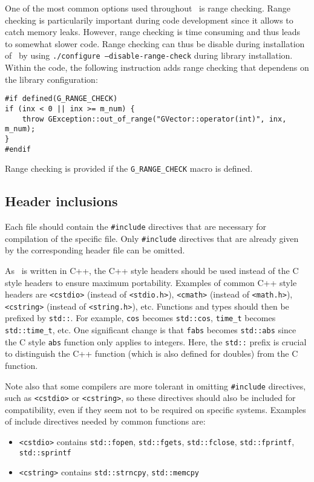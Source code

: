 \documentclass{article}[12pt,a4]
\begin{document}
One of the most common options used throughout \this\ is range checking.
Range checking is particularily important during code development since it allows to catch
memory leaks.
However, range checking is time consuming and thus leads to somewhat slower code.
Range checking can thus be disable during installation of \this\ by using
{\tt ./configure --disable-range-check} during library installation.
Within the code, the following instruction adds range checking that dependens on
the library configuration:

\begin{verbatim}
#if defined(G_RANGE_CHECK)
if (inx < 0 || inx >= m_num) {
    throw GException::out_of_range("GVector::operator(int)", inx, m_num);
}
#endif
\end{verbatim}

Range checking is provided if the {\tt G\_RANGE\_CHECK} macro is defined.


\subsection{Header inclusions}

Each file should contain the {\tt \#include} directives that are necessary for compilation of
the specific file.
Only {\tt \#include} directives that are already given by the corresponding header file can
be omitted.

As \this\ is written in C++, the C++ style headers should be used instead of the C style
headers to ensure maximum portability.
Examples of common C++ style headers are
{\tt <cstdio>} (instead of {\tt <stdio.h>}),
{\tt <cmath>} (instead of {\tt <math.h>}),
{\tt <cstring>} (instead of {\tt <string.h>}), etc.
Functions and types should then be prefixed by {\tt std::}.
For example,
{\tt cos} becomes {\tt std::cos},
{\tt time\_t} becomes {\tt std::time\_t}, etc.
One significant change is that {\tt fabs} becomes {\tt std::abs} since
the C style {\tt abs} function only applies to integers.
Here, the {\tt std::} prefix is crucial to distinguish the C++ function (which is
also defined for doubles) from the C function.

Note also that some compilers are more tolerant in omitting {\tt \#include} directives, such
as {\tt <cstdio>} or {\tt <cstring>}, so these directives should also be included for compatibility,
even if they seem not to be required on specific systems.
Examples of include directives needed by common functions are:
\begin{itemize}
\item[] {\tt <cstdio>} contains {\tt std::fopen}, {\tt std::fgets}, {\tt std::fclose}, {\tt std::fprintf}, {\tt std::sprintf}
\item[] {\tt <cstring>} contains {\tt std::strncpy}, {\tt std::memcpy}
\end{itemize}
\end{document}
